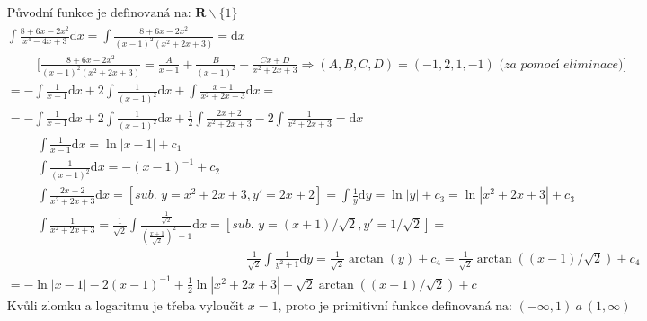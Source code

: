 \documentclass[a4paper]{article}
\newcommand{\dx}{\text{d}x}
\newcommand{\dy}{\text{d}y}
\begin{document}
\section{}
\begin{align*}
	& \text{Původní funkce je definovaná na: } \mathbf{R} \backslash  \{ 1 \} \\
	& \int \frac{8+6x-2x^2}{x^4-4x+3} \dx = \int \frac{8+6x-2x^2}{(x-1)^2(x^2+2x+3)} = \dx \\
	& \hspace{1cm} \bigg[ \frac{8+6x-2x^2}{(x-1)^2(x^2+2x+3)}  = \frac{A}{x-1} + \frac{B}{(x-1)^2} + \frac{Cx+D}{x^2+2x+3} \Rightarrow (A, B, C, D) = (-1, 2, 1, -1) \textit{ (za pomocí eliminace)}\bigg] \\
	&  = - \int \frac{1}{x-1} \dx + 2 \int \frac{1}{(x-1)^2} \dx + \int \frac{x-1}{x^2+2x+3} \dx = \\
	& = - \int \frac{1}{x-1} \dx + 2 \int \frac{1}{(x-1)^2} \dx + \frac{1}{2} \int \frac{2x+2}{x^2+2x+3}-2 \int \frac{1}{x^2+2x+3} = \dx \\	
	& \hspace{1cm} \int \frac{1}{x-1} \dx = \ln|x-1|+c_1 \\
	& \hspace{1cm} \int \frac{1}{(x-1)^2} \dx = -(x-1)^{-1}+c_2 \\
	& \hspace{1cm} \int \frac{2x+2}{x^2+2x+3} \dx =[\textit{sub. } y = x^2+2x+3, y' = 2x+2] = \int \frac{1}{y} \dy = \ln|y| + c_3 = \ln|x^2+2x+3| + c_3 \\  
	& \hspace{1cm} \int \frac{1}{x^2+2x+3} = \frac{1}{\sqrt{2}} \int \frac{\frac{1}{\sqrt{2}}}{(\frac{x+1}{\sqrt{2}})^2+1} \dx =[\textit{sub. } y = (x+1)/\sqrt{2}, y' = 1/\sqrt{2}] = \\
	& \hspace{8cm} \frac{1}{\sqrt{2}} \int \frac{1}{y^2+1} \dy = \frac{1}{\sqrt{2}} \arctan(y) + c_4 = \frac{1}{\sqrt{2}} \arctan((x-1)/\sqrt{2}) + c_4 \\
	& = - \ln|x-1| -2(x-1)^{-1}+ \frac{1}{2} \ln|x^2+2x+3|-\sqrt{2} \arctan((x-1)/\sqrt{2}) + c \\
	& \text{Kvůli zlomku a logaritmu je třeba vyloučit $x = 1$, proto je primitivní funkce definovaná na: } (-\infty, 1)\ a\ (1, \infty)\\
\end{align*}
\end{document}
